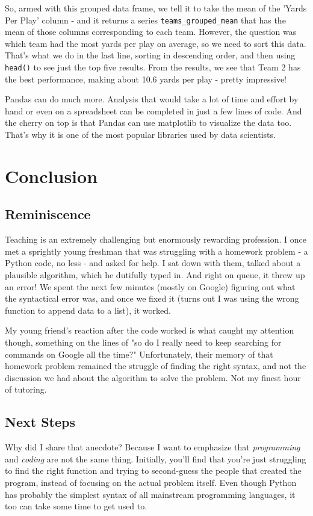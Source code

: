 \documentclass[12pt]{article}
\newcommand{\code}{\texttt}
\begin{document}
So, armed with this grouped data frame, we tell it to take the mean of the 'Yards Per Play' column - and it returns a series \code{teams\_grouped\_mean} that has the mean of those columns corresponding to each team. However, the question was which team had the most yards per play on average, so we need to sort this data. That's what we do in the last line, sorting in descending order, and then using \code{head()} to see just the top five results. From the results, we see that Team 2 has the best performance, making about 10.6 yards per play - pretty impressive!

Pandas can do much more. Analysis that would take a lot of time and effort by hand or even on a spreadsheet can be completed in just a few lines of code. And the cherry on top is that Pandas can use matplotlib to visualize the data too. That's why it is one of the most popular libraries used by data scientists. 

\newpage
\section{Conclusion}
\subsection{Reminiscence}
Teaching is an extremely challenging but enormously rewarding profession. I once met a sprightly young freshman that was struggling with a homework problem - a Python code, no less - and asked for help. I sat down with them, talked about a plausible algorithm, which he dutifully typed in. And right on queue, it threw up an error! We spent the next few minutes (mostly on Google) figuring out what the syntactical error was, and once we fixed it (turns out I was using the wrong function to append data to a list), it worked. 

My young friend's reaction after the code worked is what caught my attention though, something on the lines of "so do I really need to keep searching for commands on Google all the time?" Unfortunately, their memory of that homework problem remained the struggle of finding the right syntax, and not the discussion we had about the algorithm to solve the problem. Not my finest hour of tutoring. 

\subsection{Next Steps}
Why did I share that anecdote? Because I want to emphasize that \textit{programming} and \textit{coding} are not the same thing. Initially, you'll find that you're just struggling to find the right function and trying to second-guess the people that created the program, instead of focusing on the actual problem itself. Even though Python has probably the simplest syntax of all mainstream programming languages, it too can take some time to get used to. 
\end{document}
